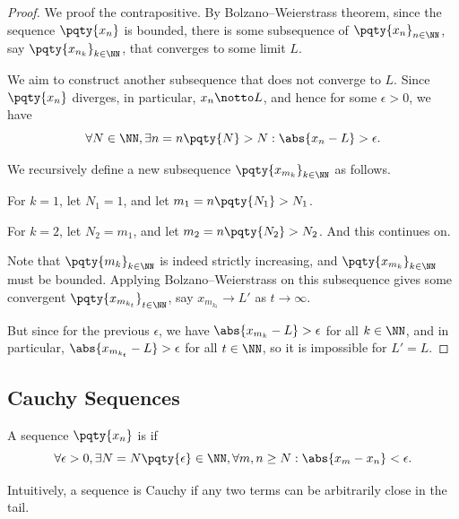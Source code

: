 \begin{proof}
    We proof the contrapositive. By Bolzano--Weierstrass theorem, since the sequence \(\pqty{x_n}\) is bounded, there is some subsequence of \(\pqty{x_n}_{n \in \NN}\), say \(\pqty{x_{n_k}}_{k \in \NN}\), that converges to some limit \(L\).

    We aim to construct another subsequence that does not converge to \(L\). Since \(\pqty{x_n}\) diverges, in particular, \(x_n \notto L\), and hence for some \(\epsilon > 0\), we have
    \[
        \forall N \in \NN, \exists n = n\pqty{N} > N: \abs{x_n - L} > \epsilon.
    \]

    We recursively define a new subsequence \(\pqty{x_{m_k}}_{k \in \NN}\) as follows.

    For \(k = 1\), let \(N_1 = 1\), and let \(m_1 = n\pqty{N_1} > N_1\).
    
    For \(k = 2\), let \(N_2 = m_1\), and let \(m_2 = n\pqty{N_2} > N_2\). And this continues on.

    Note that \(\pqty{m_k}_{k \in \NN}\) is indeed strictly increasing, and \(\pqty{x_{m_k}}_{k \in \NN}\) must be bounded. Applying Bolzano--Weierstrass on this subsequence gives some convergent \(\pqty{x_{m_{k_t}}}_{t \in \NN}\), say \(x_{m_{k_t}} \to L'\) as \(t \to \infty\).
    
    But since for the previous \(\epsilon\), we have \(\abs{x_{m_k} - L} > \epsilon\) for all \(k \in \NN\), and in particular, \(\abs{x_{m_{k_t}} - L} > \epsilon\) for all \(t \in \NN\), so it is impossible for \(L' = L\).
\end{proof}

\subsection{Cauchy Sequences}

\begin{definition}
    \label{def:seq-cauchy}%
    A sequence \(\pqty{x_n}\) is  if
    \[
        \forall \epsilon > 0, \exists N = N \pqty{\epsilon} \in \NN, \forall m, n \geq N: \abs{x_m - x_n} < \epsilon.
    \]

    Intuitively, a sequence is Cauchy if any two terms can be arbitrarily close in the tail.
\end{definition}

